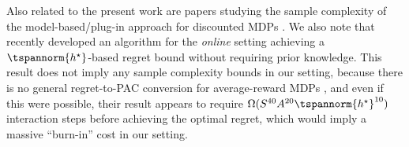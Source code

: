 Also related to the present work are papers studying the sample complexity of the model-based/plug-in approach for discounted MDPs  \citep{azar_sample_2012, azar_minimax_2013, agarwal_model-based_2020, li_breaking_2020, zurek_plug-approach_2024}.
We also note that \cite{boone_achieving_2024} recently developed an algorithm for the \emph{online} setting achieving a $\tspannorm{h^\star}$-based regret bound without requiring prior knowledge. This result does not imply any sample complexity bounds in our setting, because there is no general regret-to-PAC conversion for average-reward MDPs \citep{tuynman_finding_2024}, and even if this were possible, their result appears to require $\Omega(S^{40}A^{20}\tspannorm{h^\star}^{10})$ interaction steps before achieving the optimal regret, which would imply a massive ``burn-in'' cost in our setting.


